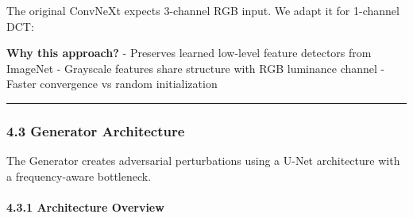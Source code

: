 The original ConvNeXt expects 3-channel RGB input. We adapt it for
1-channel DCT:

\begin{Shaded}
\begin{Highlighting}[]
\OperatorTok{=}\NormalTok{ backbone.stem[}\NormalTok{]  }
\OperatorTok{=}\NormalTok{, }\OperatorTok{=}\OperatorTok{=}\NormalTok{)}

\OperatorTok{=}\OperatorTok{=}\OperatorTok{=}\NormalTok{)}
\end{Highlighting}
\end{Shaded}

\textbf{Why this approach?} - Preserves learned low-level feature
detectors from ImageNet - Grayscale features share structure with RGB
luminance channel - Faster convergence vs random initialization

\begin{center}\rule{0.5\linewidth}{0.5pt}\end{center}

\subsubsection{4.3 Generator Architecture}\label{generator-architecture}

The Generator creates adversarial perturbations using a U-Net
architecture with a frequency-aware bottleneck.

\paragraph{4.3.1 Architecture Overview}\label{architecture-overview-1}

